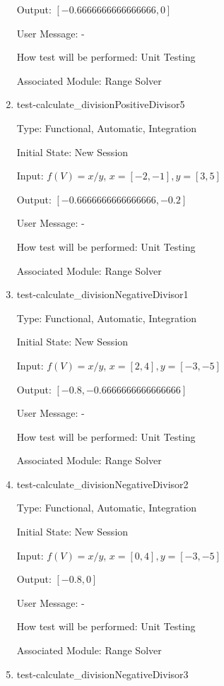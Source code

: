 \documentclass[12pt, titlepage]{article}
\begin{document}
\begin{enumerate}
	Output: $[-0.6666666666666666,0]$
	
	User Message: - 
	
	How test will be performed: Unit Testing
	
	Associated Module: Range Solver\\
	
	\item{test-calculate\_divisionPositiveDivisor5}
	
	Type: Functional, Automatic, Integration
	
	Initial State: New Session
	
	Input: $f(V) = x / y$, $x = [-2,-1], y = [3,5]$
	
	Output: $[-0.6666666666666666,-0.2]$
	
	User Message: - 
	
	How test will be performed: Unit Testing
	
	Associated Module: Range Solver\\
	
	\item{test-calculate\_divisionNegativeDivisor1}
	
	Type: Functional, Automatic, Integration
	
	Initial State: New Session
	
	Input: $f(V) = x / y$, $x = [2,4], y = [-3,-5]$
	
	Output: $[-0.8,-0.6666666666666666]$
	
	User Message: - 
	
	How test will be performed: Unit Testing
	
	Associated Module: Range Solver\\
	
	\item{test-calculate\_divisionNegativeDivisor2}
	
	Type: Functional, Automatic, Integration
	
	Initial State: New Session
	
	Input: $f(V) = x / y$, $x = [0,4], y = [-3,-5]$
	
	Output: $[-0.8,0]$
	
	User Message: - 
	
	How test will be performed: Unit Testing
	
	Associated Module: Range Solver\\
	
	\item{test-calculate\_divisionNegativeDivisor3}
	

\end{enumerate}
\end{document}
